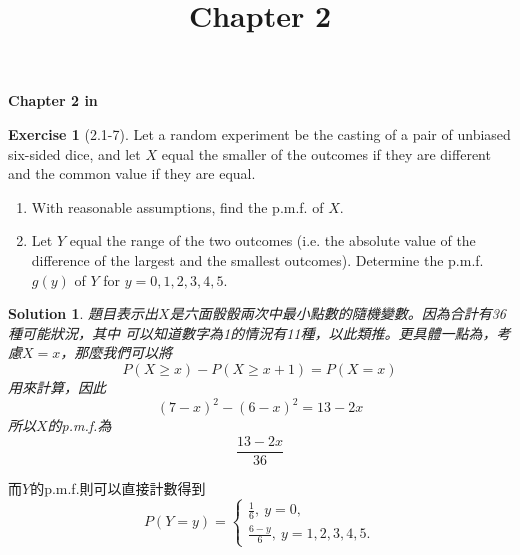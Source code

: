 \documentclass[14pt]{article}
\newtheorem*{solution}{Solution}
\theoremstyle{definition}
\newtheorem*{exercise}{Exercise}
\theoremstyle{remark}
\numberwithin{equation}{section}
\numberwithin{theorem}{section}
\begin{document}
\setcounter{section}{0}
\title{Chapter 2}

\thispagestyle{empty}
\begin{center}
{\LARGE \bf Chapter 2 in \cite{Hog10}}
\end{center}

\begin{exercise}[2.1-7]
    Let a random experiment be the casting of a pair of unbiased six-sided dice, 
    and let $X$ equal the smaller of the outcomes if they are different and the common 
    value if they are equal.
    \begin{enumerate}
    \item With reasonable assumptions, find the p.m.f. of $X$.
    \item Let $Y$ equal the range of the two outcomes (i.e. the absolute value of the difference
     of the largest and the smallest outcomes). Determine the p.m.f. $g(y)$ of $Y$ for $y=0, 1, 2, 3, 4, 5$.
    \end{enumerate}
\end{exercise}

\begin{solution}
題目表示出$X$是六面骰骰兩次中最小點數的隨機變數。因為合計有36種可能狀況，其中
可以知道數字為1的情況有11種，以此類推。更具體一點為，考慮$X=x$，那麼我們可以將 
\[
P(X\geq x)-P(X\geq x+1)=P(X=x)
\]
用來計算，因此
\[
(7-x)^2-(6-x)^2=13-2x
\]
所以$X$的p.m.f.為
\[
\frac{13-2x}{36}
\]
\end{solution}
而$Y$的p.m.f.則可以直接計數得到
\[P(Y=y)=\begin{cases}
\frac{1}{6},\ y=0,\\
\frac{6-y}{6},\ y=1,2,3,4,5.
\end{cases}\]
\newpage


\nocite{*}
\end{document}
